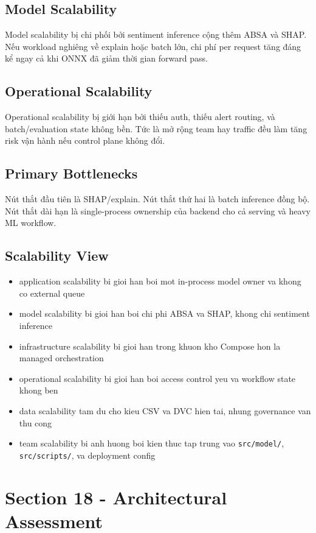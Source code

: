 \subsection{Model Scalability}
Model scalability bị chi phối bởi sentiment inference cộng thêm ABSA và SHAP. Nếu workload nghiêng về explain hoặc batch lớn, chi phí per request tăng đáng kể ngay cả khi ONNX đã giảm thời gian forward pass.

\subsection{Operational Scalability}
Operational scalability bị giới hạn bởi thiếu auth, thiếu alert routing, và batch/evaluation state không bền. Tức là mở rộng team hay traffic đều làm tăng risk vận hành nếu control plane không đổi.

\subsection{Primary Bottlenecks}
Nút thắt đầu tiên là SHAP/explain. Nút thắt thứ hai là batch inference đồng bộ. Nút thắt dài hạn là single-process ownership của backend cho cả serving và heavy ML workflow.

\subsection{Scalability View}
\begin{itemize}[leftmargin=1.2em]
  \item application scalability bi gioi han boi mot in-process model owner va khong co external queue
  \item model scalability bi gioi han boi chi phi ABSA va SHAP, khong chi sentiment inference
  \item infrastructure scalability bi gioi han trong khuon kho Compose hon la managed orchestration
  \item operational scalability bi gioi han boi access control yeu va workflow state khong ben
  \item data scalability tam du cho kieu CSV va DVC hien tai, nhung governance van thu cong
  \item team scalability bi anh huong boi kien thuc tap trung vao \texttt{src/model/}, \texttt{src/scripts/}, va deployment config
\end{itemize}

\section{Section 18 - Architectural Assessment}
